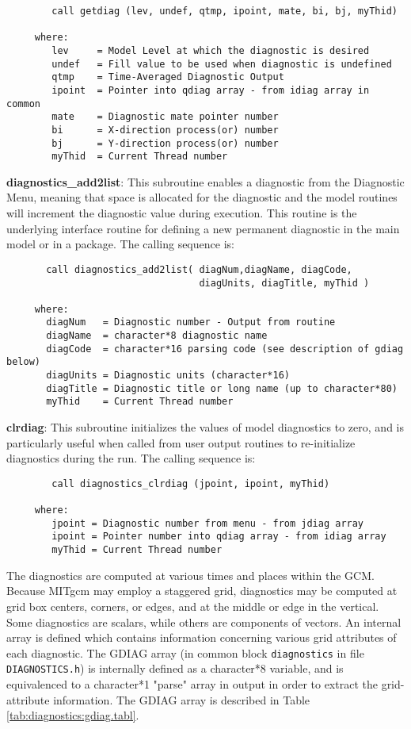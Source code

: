 \begin{verbatim}
        call getdiag (lev, undef, qtmp, ipoint, mate, bi, bj, myThid)

     where:
        lev     = Model Level at which the diagnostic is desired
        undef   = Fill value to be used when diagnostic is undefined
        qtmp    = Time-Averaged Diagnostic Output
        ipoint  = Pointer into qdiag array - from idiag array in common
        mate    = Diagnostic mate pointer number
        bi      = X-direction process(or) number
        bj      = Y-direction process(or) number
        myThid  = Current Thread number
\end{verbatim}

\noindent 
{\bf diagnostics\_add2list}: This subroutine enables a diagnostic from
the Diagnostic Menu, meaning that space is allocated for the
diagnostic and the model routines will increment the diagnostic value
during execution.  This routine is the underlying interface routine
for defining a new permanent diagnostic in the main model or in a
package.  The calling sequence is:

\begin{verbatim}
       call diagnostics_add2list( diagNum,diagName, diagCode,
                                  diagUnits, diagTitle, myThid )

     where:
       diagNum   = Diagnostic number - Output from routine
       diagName  = character*8 diagnostic name
       diagCode  = character*16 parsing code (see description of gdiag below)
       diagUnits = Diagnostic units (character*16)
       diagTitle = Diagnostic title or long name (up to character*80)
       myThid    = Current Thread number
\end{verbatim}

\noindent
{\bf clrdiag}: This subroutine initializes the values of model
diagnostics to zero, and is particularly useful when called from user
output routines to re-initialize diagnostics during the run.  The
calling sequence is:

\begin{verbatim}
        call diagnostics_clrdiag (jpoint, ipoint, myThid)

     where:
        jpoint = Diagnostic number from menu - from jdiag array
        ipoint = Pointer number into qdiag array - from idiag array
        myThid = Current Thread number
\end{verbatim}

\noindent
The diagnostics are computed at various times and places within the
GCM. Because MITgcm may employ a staggered grid, diagnostics may be
computed at grid box centers, corners, or edges, and at the middle or
edge in the vertical. Some diagnostics are scalars, while others are
components of vectors. An internal array is defined which contains
information concerning various grid attributes of each diagnostic. The
GDIAG array (in common block {\tt diagnostics} in file {\tt
  DIAGNOSTICS.h}) is internally defined as a character*8 variable, and
is equivalenced to a character*1 "parse" array in output in order to
extract the grid-attribute information.  The GDIAG array is described
in Table \ref{tab:diagnostics:gdiag.tabl}.

